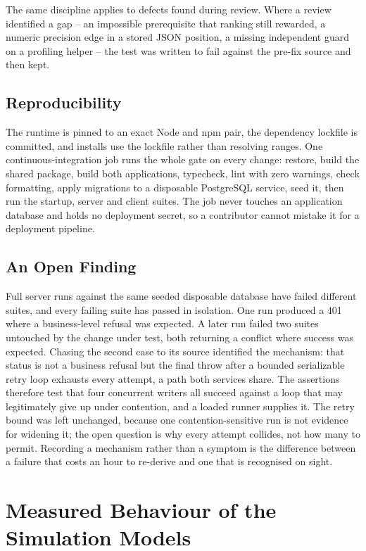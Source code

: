 The same discipline applies to defects found during review. Where a review identified a gap -- an
impossible prerequisite that ranking still rewarded, a numeric precision edge in a stored JSON
position, a missing independent guard on a profiling helper -- the test was written to fail against
the pre-fix source and then kept.

\subsection{Reproducibility}

The runtime is pinned to an exact Node and npm pair, the dependency lockfile is committed, and
installs use the lockfile rather than resolving ranges. One continuous-integration job runs the
whole gate on every change: restore, build the shared package, build both applications, typecheck,
lint with zero warnings, check formatting, apply migrations to a disposable PostgreSQL service,
seed it, then run the startup, server and client suites. The job never touches an application
database and holds no deployment secret, so a contributor cannot mistake it for a deployment
pipeline.

\subsection{An Open Finding}

Full server runs against the same seeded disposable database have failed different suites, and
every failing suite has passed in isolation. One run produced a 401 where a business-level refusal
was expected. A later run failed two suites untouched by the change under test, both returning a
conflict where success was expected. Chasing the second case to its source identified the mechanism:
that status is not a business refusal but the final throw after a bounded serializable retry loop
exhausts every attempt, a path both services share. The assertions therefore test that four
concurrent writers all succeed against a loop that may legitimately give up under contention, and a
loaded runner supplies it. The retry bound was left unchanged, because one contention-sensitive run
is not evidence for widening it; the open question is why every attempt collides, not how many to
permit. Recording a mechanism rather than a symptom is the difference between a failure that costs
an hour to re-derive and one that is recognised on sight.

\section{Measured Behaviour of the Simulation Models}

